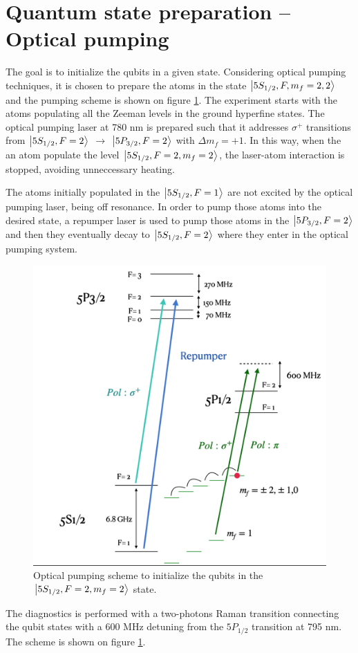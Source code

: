 \documentclass[
10pt, %
a4paper, %
oneside, %
headinclude,footinclude, %
BCOR5mm, %
]{scrartcl}
\begin{document}
\section{Quantum state preparation -- Optical pumping}

The goal is to initialize the qubits in a given state. Considering optical pumping techniques, it is chosen to prepare the atoms in the state $\ket{5S_{1/2}, F,m_{f} = 2,2}$ and the pumping scheme is shown on figure \ref{OpticalPumping}. The experiment starts with the atoms populating all the Zeeman levels in the ground hyperfine states. The optical pumping laser at 780 nm is prepared such that it addresses $\sigma^{+}$ transitions from $\ket{5S_{1/2}, F=2}$ $\rightarrow$ $\ket{5P_{3/2}, F=2}$ with $\Delta m_{f} = +1$. In this way, when the an atom populate the level $\ket{5S_{1/2}, F=2, m_{f}=2}$, the laser-atom interaction is stopped, avoiding unneccessary heating. 

The atoms initially populated in the $\ket{5S_{1/2}, F=1}$ are not excited by the optical pumping laser, being off resonance. In order to pump those atoms into the desired state, a repumper laser is used to pump those atoms in the $\ket{5P_{3/2}, F=2}$ and then they eventually decay to $\ket{5S_{1/2}, F=2}$ where they enter in the optical pumping system. 

\begin{figure}[t]
    \includegraphics[width=0.8\linewidth]{OpticalPumpingScheme}
    \centering
    \caption{Optical pumping scheme to initialize the qubits in the $\ket{5S_{1/2}, F=2, m_{f}=2}$ state.}
    \label{OpticalPumping}
\end{figure}

The diagnostics is performed with a two-photons Raman transition connecting the qubit states with a 600 MHz detuning from the $5P_{1/2}$ transition at 795 nm. The scheme is shown on figure \ref{OpticalPumping}.
\end{document}
